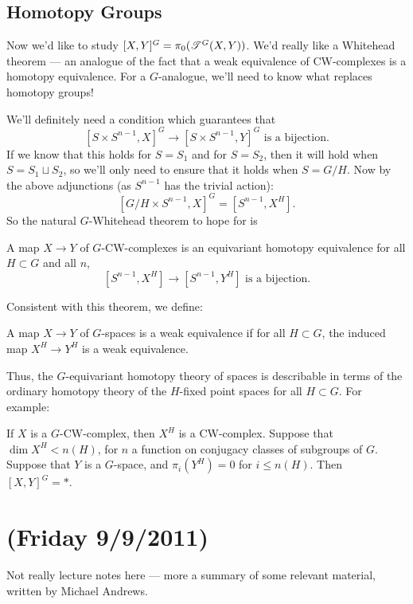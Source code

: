 \documentclass[11pt]{article}
\newcommand{\NewLecture}[3]{\section{#1 {\small(#2/#3/2011)}}}
\begin{document}
\subsection*{Homotopy Groups}
Now we'd like to study $[X,Y]^G=\pi_0(\mathscr{T}^G(X,Y))$.  We'd really like a Whitehead theorem --- an analogue of the fact that a weak equivalence of CW-complexes is a homotopy equivalence. For a $G$-analogue, we'll need to know what replaces homotopy groups!

We'll definitely need a condition which guarantees that
\[[S\times S^{n-1},X]^G\to[S\times S^{n-1},Y]^G\text{\ \ is a bijection.}\]
If we know that this holds for $S=S_1$ and for $S=S_2$, then it will hold when $S=S_1\sqcup S_2$, so we'll only need to ensure that it holds when $S=G/H$. Now by the above adjunctions (as $S^{n-1}$ has the trivial action):
\[[G/H\times S^{n-1},X]^G=[S^{n-1},X^H].\]
So the natural $G$-Whitehead theorem to hope for is
\begin{thm*}
A map $X\to Y$ of $G$-CW-complexes is an equivariant homotopy equivalence \Iff for all $H\subset G$ and all $n$,
\[[S^{n-1},X^H]\to[S^{n-1},Y^H]\text{\ \ is a bijection}.\]
\end{thm*}
\noindent Consistent with this theorem, we define:
\begin{defn*}
A map $X\to Y$ of $G$-spaces is a weak equivalence if for all $H\subset G$, the induced map $X^H\to Y^H$ is a weak equivalence.
\end{defn*}
\noindent
Thus, the $G$-equivariant homotopy theory of spaces is describable in terms of the ordinary homotopy theory of the $H$-fixed point spaces for all $H\subset G$.  For example:
\begin{thm*}
If $X$ is a $G$-CW-complex, then $X^H$ is a CW-complex. Suppose that $\dim X^H<n(H)$, for $n$ a function on conjugacy classes of subgroups of $G$. Suppose that $Y$ is a $G$-space, and $\pi_i(Y^H)=0$ for $i\leq n(H)$. Then $[X,Y]^G=*$.
\end{thm*}
\NewLecture{}{Friday 9}{9}
Not really lecture notes here --- more a summary of some relevant material, written by Michael Andrews.
\end{document}
